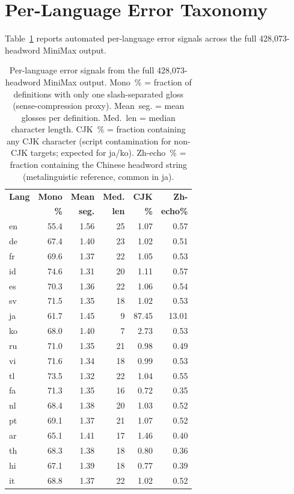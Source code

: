 \documentclass[11pt]{article}
\begin{document}
\section{Per-Language Error Taxonomy}
\label{sec:error-taxonomy}

Table~\ref{tab:error-taxonomy} reports automated per-language error signals across the full 428,073-headword MiniMax output.

\begin{table}[h]
\centering
\small
\begin{tabular}{lrrrrr}
\toprule
\textbf{Lang} & \textbf{Mono} & \textbf{Mean} & \textbf{Med.} & \textbf{CJK} & \textbf{Zh-}\\
              & \textbf{\%}   & \textbf{seg.} & \textbf{len}  & \textbf{\%}  & \textbf{echo\%}\\
\midrule
en  & 55.4 & 1.56 & 25 & 1.07 & 0.57 \\
de  & 67.4 & 1.40 & 23 & 1.02 & 0.51 \\
fr  & 69.6 & 1.37 & 22 & 1.05 & 0.53 \\
id  & 74.6 & 1.31 & 20 & 1.11 & 0.57 \\
es  & 70.3 & 1.36 & 22 & 1.06 & 0.54 \\
sv  & 71.5 & 1.35 & 18 & 1.02 & 0.53 \\
ja  & 61.7 & 1.45 &  9 & 87.45 & 13.01 \\
ko  & 68.0 & 1.40 &  7 & 2.73 & 0.53 \\
ru  & 71.0 & 1.35 & 21 & 0.98 & 0.49 \\
vi  & 71.6 & 1.34 & 18 & 0.99 & 0.53 \\
tl  & 73.5 & 1.32 & 22 & 1.04 & 0.55 \\
fa  & 71.3 & 1.35 & 16 & 0.72 & 0.35 \\
nl  & 68.4 & 1.38 & 20 & 1.03 & 0.52 \\
pt  & 69.1 & 1.37 & 21 & 1.07 & 0.52 \\
ar  & 65.1 & 1.41 & 17 & 1.46 & 0.40 \\
th  & 68.3 & 1.38 & 18 & 0.80 & 0.36 \\
hi  & 67.1 & 1.39 & 18 & 0.77 & 0.39 \\
it  & 68.8 & 1.37 & 22 & 1.02 & 0.52 \\
\bottomrule
\end{tabular}
\caption{Per-language error signals from the full 428,073-headword MiniMax output. Mono~\% = fraction of definitions with only one slash-separated gloss (sense-compression proxy). Mean~seg. = mean glosses per definition. Med.~len = median character length. CJK~\% = fraction containing any CJK character (script contamination for non-CJK targets; expected for ja/ko). Zh-echo~\% = fraction containing the Chinese headword string (metalinguistic reference, common in ja).}
\label{tab:error-taxonomy}
\end{table}
\end{document}
